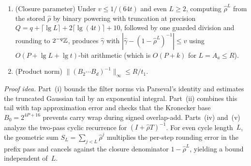 \begin{lemma}
\begin{enumerate}[label=(\roman*),leftmargin=*]
    \[
      \|\widehat Z-Z\|_\infty\le 32t^2\,v\max(1,\|Y\|_\infty),
    \]
    and every intermediate state has modulus strictly below $7t\max(1,\|Y\|_\infty)$.
  \item \textup{(Closure parameter)} Under $v\le 1/(64t)$ and even $L\ge 2$, computing $\hat\rho^L$ from the stored
    $\hat\rho$ by binary powering with truncation at precision $Q=q+\lceil\lg L\rceil+2\lceil\lg(4t)\rceil+10$, followed
    by one guarded division and rounding to $2^{-q}\mathbb{Z}$, produces $\hat\gamma$ with
    $|\hat\gamma-(1-\hat\rho^L)^{-1}|\le v$ using $O(P+\lg L+\lg t)$-bit arithmetic (which is $O(P+k)$ for $L=A_a\le R$).
  \item \textup{(Product norm)} $\|(B_2\cdots B_d)^{-1}\|_\infty\le R/t_1$.
\end{enumerate}
\end{lemma}

\emph{Proof idea.} Part~(i) bounds the filter norms via Parseval's identity and estimates the truncated Gaussian tail by
an exponential integral. Part~(ii) combines this tail with tap approximation error and checks that the Kronecker base
$B_0=2^{4P+16}$ prevents carry wrap during signed overlap-add. Parts~(iv) and~(v) analyze the two-pass cyclic recurrence
for $(I+\hat\rho T)^{-1}$. For even cycle length~$L$, the geometric sum $S_L=\sum_{j<L}\hat\rho^j$ multiplies the
per-step rounding error in the prefix pass and cancels against the closure denominator $1-\hat\rho^L$, yielding a bound
independent of~$L$.

